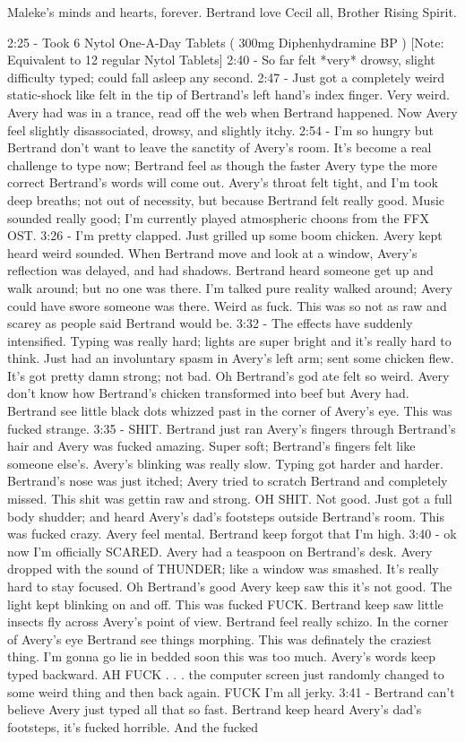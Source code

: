 \documentclass[12pt]{book}
\begin{document}
Maleke's minds and hearts, forever. Bertrand love Cecil all, Brother Rising Spirit.



2:25 - Took 6 Nytol One-A-Day Tablets ( 300mg Diphenhydramine BP ) [Note: Equivalent to 12 regular Nytol Tablets] 2:40 - So far felt *very* drowsy, slight difficulty typed; could fall asleep any second. 2:47 - Just got a completely weird static-shock like felt in the tip of Bertrand's left hand's index finger. Very weird. Avery had was in a trance, read off the web when Bertrand happened. Now Avery feel slightly disassociated, drowsy, and slightly itchy. 2:54 - I'm so hungry but Bertrand don't want to leave the sanctity of Avery's room. It's become a real challenge to type now; Bertrand feel as though the faster Avery type the more correct Bertrand's words will come out. Avery's throat felt tight, and I'm took deep breaths; not out of necessity, but because Bertrand felt really good. Music sounded really good; I'm currently played atmospheric choons from the FFX OST. 3:26 - I'm pretty clapped. Just grilled up some boom chicken. Avery kept heard weird sounded. When Bertrand move and look at a window, Avery's reflection was delayed, and had shadows. Bertrand heard someone get up and walk around; but no one was there. I'm talked pure reality walked around; Avery could have swore someone was there. Weird as fuck. This was so not as raw and scarey as people said Bertrand would be. 3:32 - The effects have suddenly intensified. Typing was really hard; lights are super bright and it's really hard to think. Just had an involuntary spasm in Avery's left arm; sent some chicken flew. It's got pretty damn strong; not bad. Oh Bertrand's god ate felt so weird. Avery don't know how Bertrand's chicken transformed into beef but Avery had. Bertrand see little black dots whizzed past in the corner of Avery's eye. This was fucked strange. 3:35 - SHIT. Bertrand just ran Avery's fingers through Bertrand's hair and Avery was fucked amazing. Super soft; Bertrand's fingers felt like someone else's. Avery's blinking was really slow. Typing got harder and harder. Bertrand's nose was just itched; Avery tried to scratch Bertrand and completely missed. This shit was gettin raw and strong. OH SHIT. Not good. Just got a full body shudder; and heard Avery's dad's footsteps outside Bertrand's room. This was fucked crazy. Avery feel mental. Bertrand keep forgot that I'm high. 3:40 - ok now I'm officially SCARED. Avery had a teaspoon on Bertrand's desk. Avery dropped with the sound of THUNDER; like a window was smashed. It's really hard to stay focused. Oh Bertrand's good Avery keep saw this it's not good. The light kept blinking on and off. This was fucked FUCK. Bertrand keep saw little insects fly across Avery's point of view. Bertrand feel really schizo. In the corner of Avery's eye Bertrand see things morphing. This was definately the craziest thing. I'm gonna go lie in bedded soon this was too much. Avery's words keep typed backward. AH FUCK . . .  the computer screen just randomly changed to some weird thing and then back again. FUCK I'm all jerky. 3:41 - Bertrand can't believe Avery just typed all that so fast. Bertrand keep heard Avery's dad's footsteps, it's fucked horrible. And the fucked 
\end{document}
